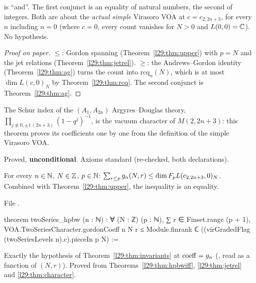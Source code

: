 \begin{dictionary}
 is ``and''. The first conjunct is an equality of natural numbers, the second of integers. Both are about the
\emph{actual simple} Virasoro VOA at $c=c_{2,2n+3}$, for every $n$ including $n=0$ (where $c=0$, every count vanishes
for $N>0$ and $L(0,0)={\mathbb{C}}$). No hypothesis.
\end{dictionary}

\begin{proof}[Proof on paper]
$\le$: Gordon spanning (Theorem~\ref{l29:thm:upper}) with $p=N$ and the jet relations (Theorem~\ref{l29:thm:jetrel}).
$\ge$: the Andrews--Gordon identity (Theorem~\ref{l29:thm:ag}) turns the count into $\mathrm{rcq}_n(N)$, which is at
most $\dim L(c,0)_N$ by Theorem~\ref{l29:thm:rcq}. The second conjunct is Theorem~\ref{l29:thm:ag}.
\end{proof}

\begin{physics}
The Schur index of the $(A_1,A_{2n})$ Argyres--Douglas theory, $\prod_{j\not\equiv0,\pm1\,(2n+3)}(1-q^j)^{-1}$, is the
vacuum character of $M(2,2n+3)$: this theorem proves its coefficients one by one from the definition of the simple
Virasoro VOA.
\end{physics}

\begin{status}
Proved, \textbf{unconditional}. Axioms standard (re-checked, both declarations).
\end{status}

\begin{theorem}\label{l29:thm:hpbw}
For every $n\in{\mathbb{N}}$, $N\in{\mathbb{Z}}$, $p\in{\mathbb{N}}$: $\sum_{r\le p}g_n(N,r)\le\dim F_pL(c_{2,2n+3},0)_N$. Combined with
Theorem~\ref{l29:thm:upper}, the inequality is an equality.
\end{theorem}

\noindent File .
\begin{leancode}
theorem twoSeries_hpbw (n : ℕ) :
    ∀ (N : ℤ) (p : ℕ), ∑ r ∈ Finset.range (p + 1), VOA.TwoSeriesCharacter.gordonCoeff n N r ≤
      Module.finrank ℂ ((virGradedFlag (twoSeriesLevels n).c).pieceIn p N) :=
\end{leancode}

\begin{dictionary}
Exactly the hypothesis  of Theorem~\ref{l29:thm:invariants} at $\mathrm{coeff}=g_n$
(, read as a function of $(N,r)$). Proved from Theorems~\ref{l29:thm:hpbwiff},
\ref{l29:thm:jetrel} and \ref{l29:thm:character}.
\end{dictionary}

